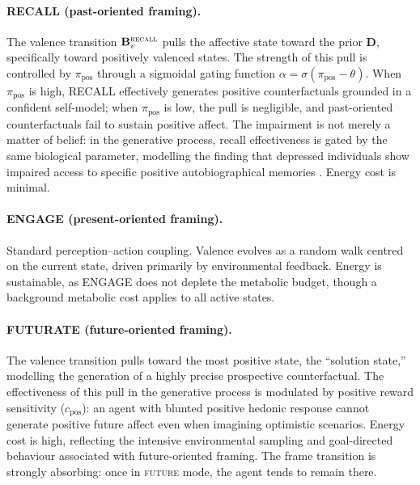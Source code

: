 \documentclass[11pt,a4paper]{article}
\begin{document}
\paragraph{RECALL (past-oriented framing).}
The valence transition $\mathbf{B}_v^{\textsc{recall}}$ pulls the affective state toward the prior $\mathbf{D}$, specifically toward positively valenced states. The strength of this pull is controlled by $\pi_{\text{pos}}$ through a sigmoidal gating function $\alpha = \sigma(\pi_{\text{pos}} - \theta)$. When $\pi_{\text{pos}}$ is high, RECALL effectively generates positive counterfactuals grounded in a confident self-model; when $\pi_{\text{pos}}$ is low, the pull is negligible, and past-oriented counterfactuals fail to sustain positive affect. The impairment is not merely a matter of belief: in the generative process, recall effectiveness is gated by the same biological parameter, modelling the finding that depressed individuals show impaired access to specific positive autobiographical memories \citep{williams2007autobiographical}. Energy cost is minimal.

\paragraph{ENGAGE (present-oriented framing).}
Standard perception--action coupling. Valence evolves as a random walk centred on the current state, driven primarily by environmental feedback. Energy is sustainable, as ENGAGE does not deplete the metabolic budget, though a background metabolic cost applies to all active states.

\paragraph{FUTURATE (future-oriented framing).}
The valence transition pulls toward the most positive state, the ``solution state,'' modelling the generation of a highly precise prospective counterfactual. The effectiveness of this pull in the generative process is modulated by positive reward sensitivity ($c_{\text{pos}}$): an agent with blunted positive hedonic response cannot generate positive future affect even when imagining optimistic scenarios. Energy cost is high, reflecting the intensive environmental sampling and goal-directed behaviour associated with future-oriented framing. The frame transition is strongly absorbing: once in \textsc{future} mode, the agent tends to remain there.
\end{document}

